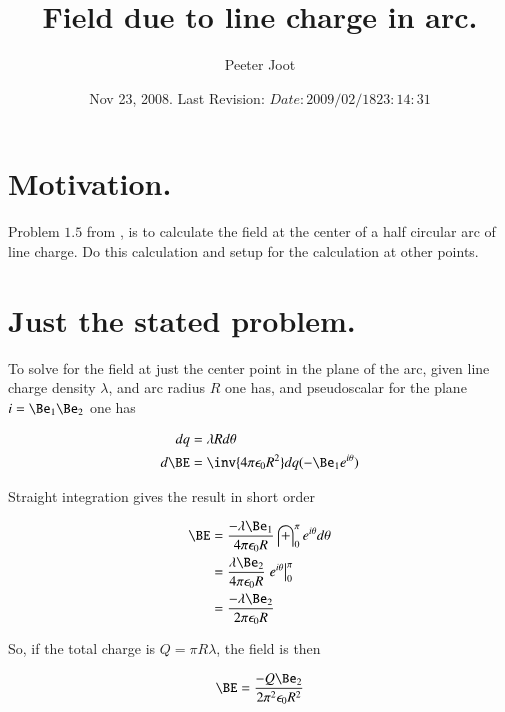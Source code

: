 \documentclass{article}
\title{ Field due to line charge in arc.}
\author{Peeter Joot}
\date{ Nov 23, 2008.  Last Revision: $Date: 2009/02/18 23:14:31 $ }
\begin{document}
\maketitle{}


\section{ Motivation. }

Problem $1.5$ from \cite{purcell1963eam}, is to calculate the field
at the center of a half circular arc of line charge.  Do this calculation
and setup for the calculation at other points.

\section{ Just the stated problem. }

%

To solve for the field at just the center point in the plane of the arc, given line charge density $\lambda$, and arc
radius $R$ one has, and pseudoscalar for the plane $i = \Be_1\Be_2$ one has

\begin{align*}
dq &= \lambda R d\theta \\
d\BE &= \inv{4 \pi \epsilon_0 R^2} dq (-\Be_1 e^{i\theta} )
\end{align*}

Straight integration gives the result in short order

\begin{align*}
\BE
&= \frac{-\lambda \Be_1}{4 \pi \epsilon_0 R} \int_0^\pi e^{i\theta} d\theta \\
&= \frac{\lambda \Be_2}{4 \pi \epsilon_0 R} \left. e^{i\theta} \right\vert_0^\pi \\
&= \frac{-\lambda \Be_2}{2 \pi \epsilon_0 R}
\end{align*}

So, if the total charge is $Q = \pi R \lambda$, the field is then

\begin{align*}
\BE
&= \frac{-Q \Be_2}{2 \pi^2 \epsilon_0 R^2} \\
\end{align*}
\end{document}

